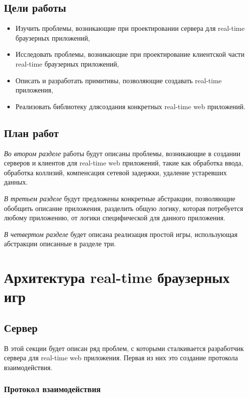 \documentclass[a4paper,14pt, openany]{book}
\begin{document}
\section{Цели работы}

\begin{itemize}
  \item Изучить проблемы, возникающие при проектировании сервера для real-time браузерных приложений,
  \item Исследовать проблемы, возникающие при проектирование клиентской части real-time браузерных приложений,
  \item Описать и разработать примитивы, позволяющие создавать real-time приложения,
  \item Реализовать библиотеку длясоздания конкретных real-time web приложений.
\end{itemize}

\section{План работ}
\emph{Во втором разделе} работы будут описаны проблемы, возникающие в создании серверов и клиентов для real-time web приложений, такие как обработка ввода, обработка коллизий, компенсация сетевой задержки, удаление устаревших данных. 

\emph{В третьем разделе} будут предложены конкретные абстракции, позволяющие обобщить описание приложения, разделить общую логику, которая потребуется любому приложению, от логики специфической для данного приложения. 

\emph{В четвертом разделе} будет описана реализация простой игры, использующая абстракции описанные в разделе три.


\chapter{Архитектура  real-time браузерных игр}

\section{Сервер}

В этой секции будет описан ряд проблем, с которыми сталкивается разработчик сервера для real-time web приложения. Первая из них это создание протокола взаимодействия.

\subsection{Протокол взаимодействия}
\end{document}
